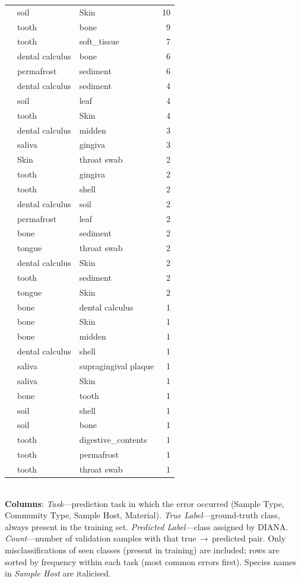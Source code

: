 \begin{longtable}{lp{4cm}p{4cm}r}
 & soil & Skin & 10 \\
 & tooth & bone & 9 \\
 & tooth & soft\_tissue & 7 \\
 & dental calculus & bone & 6 \\
 & permafrost & sediment & 6 \\
 & dental calculus & sediment & 4 \\
 & soil & leaf & 4 \\
 & tooth & Skin & 4 \\
 & dental calculus & midden & 3 \\
 & saliva & gingiva & 3 \\
 & Skin & throat swab & 2 \\
 & tooth & gingiva & 2 \\
 & tooth & shell & 2 \\
 & dental calculus & soil & 2 \\
 & permafrost & leaf & 2 \\
 & bone & sediment & 2 \\
 & tongue & throat swab & 2 \\
 & dental calculus & Skin & 2 \\
 & tooth & sediment & 2 \\
 & tongue & Skin & 2 \\
 & bone & dental calculus & 1 \\
 & bone & Skin & 1 \\
 & bone & midden & 1 \\
 & dental calculus & shell & 1 \\
 & saliva & supragingival plaque & 1 \\
 & saliva & Skin & 1 \\
 & bone & tooth & 1 \\
 & soil & shell & 1 \\
 & soil & bone & 1 \\
 & tooth & digestive\_contents & 1 \\
 & tooth & permafrost & 1 \\
 & tooth & throat swab & 1 \\
\end{longtable}
\\[2mm]
{\footnotesize \textbf{Columns}: \textit{Task}---prediction task in which the error occurred (Sample Type, Community Type, Sample Host, Material). \textit{True Label}---ground-truth class, always present in the training set. \textit{Predicted Label}---class assigned by DIANA. \textit{Count}---number of validation samples with that true\,$\to$\,predicted pair. Only misclassifications of seen classes (present in training) are included; rows are sorted by frequency within each task (most common errors first). Species names in \textit{Sample Host} are italicised.}
